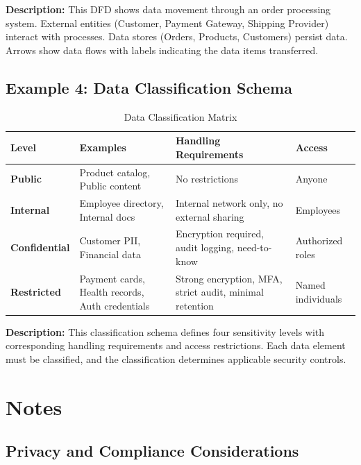 \documentclass[11pt,letterpaper]{article}
\begin{document}
\textbf{Description:} This DFD shows data movement through an order processing system. External entities (Customer, Payment Gateway, Shipping Provider) interact with processes. Data stores (Orders, Products, Customers) persist data. Arrows show data flows with labels indicating the data items transferred.

\subsection{Example 4: Data Classification Schema}

\begin{table}[H]
\centering
\caption{Data Classification Matrix}
\small
\begin{tabular}{@{}L{2.2cm}L{3cm}L{4cm}L{\dimexpr\linewidth-9.2cm-6\tabcolsep\relax}@{}}
\toprule
\textbf{Level} & \textbf{Examples} & \textbf{Handling Requirements} & \textbf{Access} \\
\midrule
{}\textbf{Public} & Product catalog, Public content & No restrictions & Anyone \\
\addlinespace
{}\textbf{Internal} & Employee directory, Internal docs & Internal network only, no external sharing & Employees \\
\addlinespace
{}\textbf{Confidential} & Customer PII, Financial data & Encryption required, audit logging, need-to-know & Authorized roles \\
\addlinespace
{}\textbf{Restricted} & Payment cards, Health records, Auth credentials & Strong encryption, MFA, strict audit, minimal retention & Named individuals \\
\bottomrule
\end{tabular}
\end{table}

\textbf{Description:} This classification schema defines four sensitivity levels with corresponding handling requirements and access restrictions. Each data element must be classified, and the classification determines applicable security controls.

\section{Notes}

\subsection{Privacy and Compliance Considerations}
\end{document}
